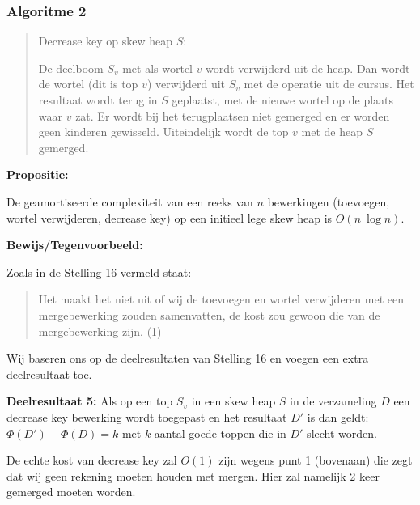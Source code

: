 \documentclass[12pt,a4paper,fleqn]{report}
\begin{document}
	\subsubsection{Algoritme 2}
	\begin{quote}
		Decrease key op skew heap $S$:

		De deelboom $S_{v}$ met als wortel $v$ wordt verwijderd uit de heap. Dan wordt de wortel
		(dit is top $v$) verwijderd uit $S_{v}$ met de operatie uit de cursus. Het resultaat wordt
		terug in $S$ geplaatst, met de nieuwe wortel op de plaats waar $v$ zat. Er wordt bij het
		terugplaatsen niet gemerged en er worden geen kinderen gewisseld. Uiteindelijk wordt de
		top $v$ met de heap $S$ gemerged.
	\end{quote}

	\textbf{Propositie:}

	De geamortiseerde complexiteit van een reeks van $n$ bewerkingen
	(toevoegen, wortel verwijderen, decrease key) op een initieel lege skew heap is $O(n\ \log n)$.
	\newline

	\textbf{Bewijs/Tegenvoorbeeld:}

	Zoals in de Stelling 16 vermeld staat:
	\begin{quote}
		Het maakt het niet uit of wij de toevoegen en wortel verwijderen met een
		mergebewerking zouden samenvatten, de kost zou gewoon die van
		de mergebewerking zijn. (1)
	\end{quote}

	Wij baseren ons op de deelresultaten van Stelling 16 en voegen een
	extra deelresultaat toe.
	\newline

	\textbf{Deelresultaat 5:}
	Als op een top $S_v$ in een skew heap $S$ in de verzameling $D$ een decrease
	key bewerking wordt	toegepast en het resultaat $D'$ is dan geldt:
	$\Phi (D') - \Phi (D) = k$
	met $k$ aantal goede toppen die in $D'$ slecht worden.
	\newline

	De echte kost van decrease key zal $O(1)$ zijn wegens punt 1 (bovenaan) die zegt
	dat wij geen rekening moeten houden met mergen. Hier zal namelijk 2 keer gemerged moeten worden.
\end{document}
